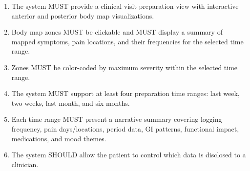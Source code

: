 \begin{enumerate}
  \item The system MUST provide a clinical visit preparation view with interactive anterior and posterior body map visualizations.
  \item Body map zones MUST be clickable and MUST display a summary of mapped symptoms, pain locations, and their frequencies for the selected time range.
  \item Zones MUST be color-coded by maximum severity within the selected time range.
  \item The system MUST support at least four preparation time ranges: last week, two weeks, last month, and six months.
  \item Each time range MUST present a narrative summary covering logging frequency, pain days/locations, period data, GI patterns, functional impact, medications, and mood themes.
  \item The system SHOULD allow the patient to control which data is disclosed to a clinician.
\end{enumerate}

\endgroup
